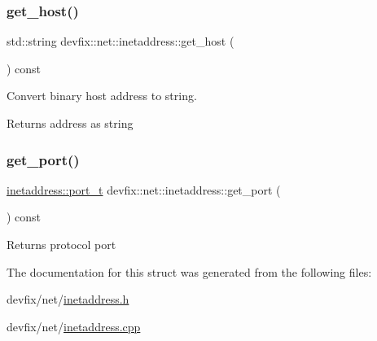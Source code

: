 \subsubsection{\texorpdfstring{get\+\_\+host()}{get\_host()}}
{\footnotesize\ttfamily std\+::string devfix\+::net\+::inetaddress\+::get\+\_\+host (\begin{DoxyParamCaption}{ }\end{DoxyParamCaption}) const\hspace{0.3cm}{\ttfamily [noexcept]}}



Convert binary host address to string. 

\begin{DoxyReturn}{Returns}
address as string 
\end{DoxyReturn}
\mbox{\label{structdevfix_1_1net_1_1inetaddress_ad2c4af8ffc473aebc58bc1bbe0277e7d}} 
\subsubsection{\texorpdfstring{get\+\_\+port()}{get\_port()}}
{\footnotesize\ttfamily \hyperlink{structdevfix_1_1net_1_1inetaddress_a3eaadc730f2b4625987cf948ea485410}{inetaddress\+::port\+\_\+t} devfix\+::net\+::inetaddress\+::get\+\_\+port (\begin{DoxyParamCaption}{ }\end{DoxyParamCaption}) const}

\begin{DoxyReturn}{Returns}
protocol port 
\end{DoxyReturn}


The documentation for this struct was generated from the following files\+:\begin{DoxyCompactItemize}
\item 
devfix/net/\hyperlink{inetaddress_8h}{inetaddress.\+h}\item 
devfix/net/\hyperlink{inetaddress_8cpp}{inetaddress.\+cpp}\end{DoxyCompactItemize}
